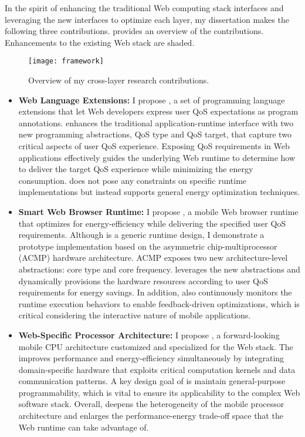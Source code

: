 In the spirit of enhancing the traditional Web computing stack interfaces and leveraging the new interfaces to optimize each layer, my dissertation makes the following three contributions.  provides an overview of the contributions. Enhancements to the existing Web stack are shaded.

\begin{sidewaysfigure}
    \centering
    \texttt{[image: framework]}
    \caption{Overview of my cross-layer research contributions.}
    \label{fig:framework}
\end{sidewaysfigure}

\begin{itemize}
\item \textbf{Web Language Extensions:} I propose \greenweb, a set of programming language extensions that let Web developers express user QoS expectations as program annotations. \greenweb enhances the traditional application-runtime interface with two new programming abstractions, QoS type and QoS target, that capture two critical aspects of user QoS experience. Exposing QoS requirements in Web applications effectively guides the underlying Web runtime to determine how to deliver the target QoS experience while minimizing the energy consumption. \greenweb does not pose any constraints on specific runtime implementations but instead supports general energy optimization techniques.

\item \textbf{Smart Web Browser Runtime:} I propose \webrt, a  mobile Web browser runtime that optimizes for energy-efficiency while delivering the specified user QoS requirements. Although \webrt is a generic runtime design, I demonstrate a prototype implementation based on the asymmetric chip-multiprocessor (ACMP) hardware architecture. ACMP exposes two new architecture-level abstractions: core type and core frequency. \webrt leverages the new abstractions and dynamically provisions the hardware resources according to user QoS requirements for energy savings. In addition, \webrt also continuously monitors the runtime execution behaviors to enable feedback-driven optimizations, which is critical considering the interactive nature of mobile applications.

\item \textbf{Web-Specific Processor Architecture:} I propose \webcore, a forward-looking mobile CPU architecture customized and specialized for the Web stack. The \webcore improves performance and energy-efficiency simultaneously by integrating domain-specific hardware that exploits critical computation kernels and data communication patterns. A key design goal of \webcore is maintain general-purpose programmability, which is vital to ensure its applicability to the complex Web software stack. Overall, \webcore deepens the heterogeneity of the mobile processor architecture and enlarges the performance-energy trade-off space that the Web runtime can take advantage of.
\end{itemize}

